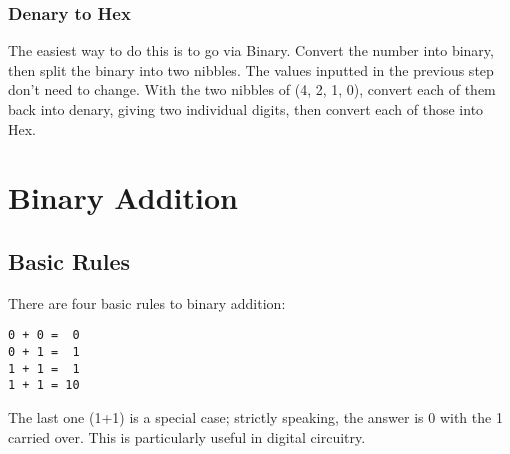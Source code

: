 \subsubsection*{Denary to Hex}
The easiest way to do this is to go via Binary. Convert the number into binary, then split the binary into two nibbles. The values inputted in the previous step don't need to change. With the two nibbles of (4, 2, 1, 0), convert each of them back into denary, giving two individual digits, then convert each of those into Hex. 

\section*{Binary Addition}
\subsection*{Basic Rules}
There are four basic rules to binary addition:
\begin{verbatim}
0 + 0 =  0
0 + 1 =  1
1 + 1 =  1
1 + 1 = 10 
\end{verbatim}
The last one (1+1) is a special case; strictly speaking, the answer is 0 with the 1 carried over. This is particularly useful in digital circuitry.
